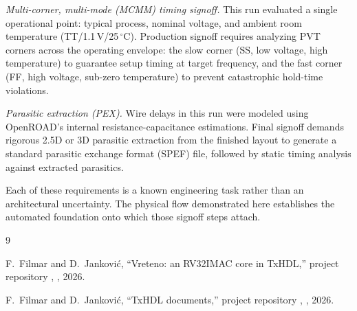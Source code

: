 \documentclass[journal,9pt]{IEEEtran}
\begin{document}
\emph{Multi-corner, multi-mode (MCMM) timing signoff.} This run evaluated
a single operational point: typical process, nominal voltage, and
ambient room temperature (TT/1.1\,V/25\,$^\circ$C). Production signoff
requires analyzing PVT corners across the operating envelope: the slow
corner (SS, low voltage, high temperature) to guarantee setup timing at
target frequency, and the fast corner (FF, high voltage, sub-zero
temperature) to prevent catastrophic hold-time violations.

\emph{Parasitic extraction (PEX).} Wire delays in this run were modeled
using OpenROAD's internal resistance-capacitance estimations. Final
signoff demands rigorous 2.5D or 3D parasitic extraction from the
finished layout to generate a standard parasitic exchange format (SPEF)
file, followed by static timing analysis against extracted parasitics.

Each of these requirements is a known engineering task rather than an
architectural uncertainty. The physical flow demonstrated here
establishes the automated foundation onto which those signoff steps
attach.


\begin{thebibliography}{9}

F.~Filmar and D.~Janković, ``Vreteno: an RV32IMAC core in TxHDL,''
project repository , , 2026.

F.~Filmar and D.~Janković, ``TxHDL documents,'' project repository
, , 2026.

\end{thebibliography}
\end{document}
